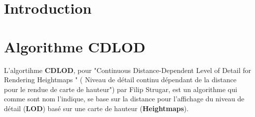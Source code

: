 \documentclass[12pt]{report}
\begin{document}











\tableofcontents

\thispagestyle{empty} %


















\newpage

\chapter*{Introduction}
\setcounter{chapter}{1}
















\newpage

\chapter*{Algorithme CDLOD}

L'algortihme \textbf{CDLOD}, pour "Continuous Distance-Dependent Level of Detail for Rendering Heightmaps " ( 
Niveau de détail continu dépendant de la distance pour le rendue de carte de hauteur") par Filip Strugar, est un algorithme qui comme sont nom l'indique, se base sur la distance pour l'affichage du niveau de détail (\textbf{LOD}) basé sur une carte de hauteur (\textbf{Heightmaps}).
\end{document}
